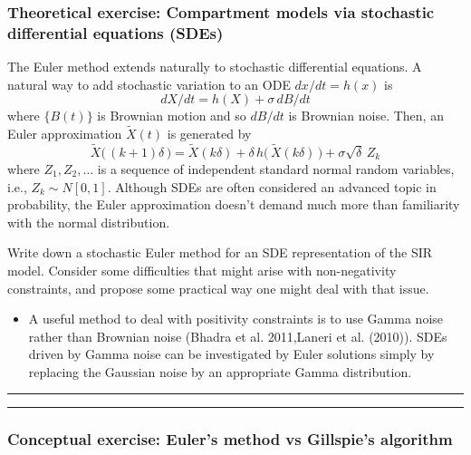 \documentclass[]{article}
\providecommand{\tightlist}{%
  \setlength{\itemsep}{0pt}\setlength{\parskip}{0pt}}
\begin{document}
\subsubsection{Theoretical exercise: Compartment models via stochastic
differential equations
(SDEs)}\label{theoretical-exercise-compartment-models-via-stochastic-differential-equations-sdes}

The Euler method extends naturally to stochastic differential equations.
A natural way to add stochastic variation to an ODE \(dx/dt=h(x)\) is
\[ dX/dt = h(X) + \sigma \, dB/dt\] where \(\{B(t)\}\) is Brownian
motion and so \(dB/dt\) is Brownian noise. Then, an Euler approximation
\(\tilde X(t)\) is generated by
\[ \tilde X\big( \,(k+1)\delta\,\big) = \tilde X( k\delta) + \delta\, h\big(\, \tilde X(k\delta)\,\big) + \sigma \sqrt{\delta} \, Z_k\]
where \(Z_1,Z_2,\dots\) is a sequence of independent standard normal
random variables, i.e., \(Z_k\sim N[0,1]\). Although SDEs are often
considered an advanced topic in probability, the Euler approximation
doesn't demand much more than familiarity with the normal distribution.

Write down a stochastic Euler method for an SDE representation of the
SIR model. Consider some difficulties that might arise with
non-negativity constraints, and propose some practical way one might
deal with that issue.

\begin{itemize}
\tightlist
\item
  A useful method to deal with positivity constraints is to use Gamma
  noise rather than Brownian noise (Bhadra et al. 2011,Laneri et al.
  (2010)). SDEs driven by Gamma noise can be investigated by Euler
  solutions simply by replacing the Gaussian noise by an appropriate
  Gamma distribution.
\end{itemize}

\begin{center}\rule{0.5\linewidth}{\linethickness}\end{center}

\begin{center}\rule{0.5\linewidth}{\linethickness}\end{center}

\subsubsection{Conceptual exercise: Euler's method vs Gillspie's
algorithm}\label{conceptual-exercise-eulers-method-vs-gillspies-algorithm}
\end{document}

